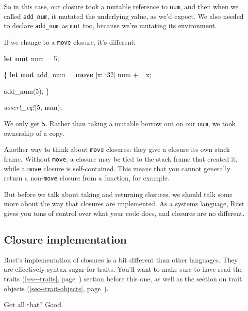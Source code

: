\documentclass[a4paper,]{book}
\renewcommand*{\hyperlink}[2]{%
 #2 (\autoref{#1}, page~\pageref{#1})}
\newenvironment{Shaded}{\begin{snugshade}}{\end{snugshade}}
\newcommand{\KeywordTok}[1]{\textcolor[rgb]{0.13,0.29,0.53}{\textbf{{#1}}}}
\newcommand{\DataTypeTok}[1]{\textcolor[rgb]{0.13,0.29,0.53}{{#1}}}
\newcommand{\DecValTok}[1]{\textcolor[rgb]{0.00,0.00,0.81}{{#1}}}
\newcommand{\PreprocessorTok}[1]{\textcolor[rgb]{0.56,0.35,0.01}{\textit{{#1}}}}
\newcommand{\NormalTok}[1]{{#1}}
\begin{document}
So in this case, our closure took a mutable reference to \texttt{num},
and then when we called \texttt{add\_num}, it mutated the underlying
value, as we'd expect. We also needed to declare \texttt{add\_num} as
\texttt{mut} too, because we're mutating its environment.

If we change to a \texttt{move} closure, it's different:

\begin{Shaded}
\begin{Highlighting}[]
\KeywordTok{let} \KeywordTok{mut} \NormalTok{num = }\DecValTok{5}\NormalTok{;}

\NormalTok{\{}
    \KeywordTok{let} \KeywordTok{mut} \NormalTok{add_num = }\KeywordTok{move} \NormalTok{|x: }\DataTypeTok{i32}\NormalTok{| num += x;}

    \NormalTok{add_num(}\DecValTok{5}\NormalTok{);}
\NormalTok{\}}

\PreprocessorTok{assert_eq!}\NormalTok{(}\DecValTok{5}\NormalTok{, num);}
\end{Highlighting}
\end{Shaded}

We only get \texttt{5}. Rather than taking a mutable borrow out on our
\texttt{num}, we took ownership of a copy.

Another way to think about \texttt{move} closures: they give a closure
its own stack frame. Without \texttt{move}, a closure may be tied to the
stack frame that created it, while a \texttt{move} closure is
self-contained. This means that you cannot generally return a
non-\texttt{move} closure from a function, for example.

But before we talk about taking and returning closures, we should talk
some more about the way that closures are implemented. As a systems
language, Rust gives you tons of control over what your code does, and
closures are no different.

\subsection{Closure implementation}\label{closure-implementation}

Rust's implementation of closures is a bit different than other
languages. They are effectively syntax sugar for traits. You'll want to
make sure to have read the \protect\hyperlink{sec--traits}{traits}
section before this one, as well as the section on
\protect\hyperlink{sec--trait-objects}{trait objects}.

Got all that? Good.
\end{document}
